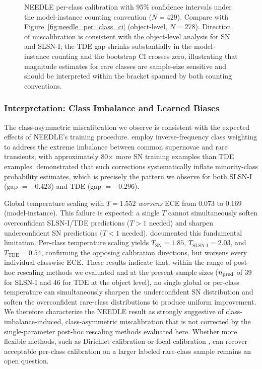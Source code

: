 \documentclass[twocolumn]{aastex631}
\begin{document}
\begin{figure}[t]
\caption{NEEDLE per-class calibration with 95\% confidence intervals
under the model-instance counting convention ($N = 429$). Compare with
Figure~\ref{fig:needle_per_class_ci} (object-level, $N = 278$).
Direction of miscalibration is consistent with the object-level
analysis for SN and SLSN-I; the TDE gap shrinks substantially in the
model-instance counting and the bootstrap CI crosses zero, illustrating
that magnitude estimates for rare classes are sample-size sensitive
and should be interpreted within the bracket spanned by both
counting conventions. \label{fig:needle_per_class_ci_mi}}
\end{figure}

\subsubsection{Interpretation: Class Imbalance and Learned Biases}\label{sec:needle_interp}

The class-asymmetric miscalibration we observe is consistent with
the expected effects of NEEDLE's training procedure.
\citet{sheng2024} employ inverse-frequency class weighting to address the extreme imbalance between common supernovae and rare transients, with approximately 80$\times$ more SN training examples than TDE examples. \citet{vandengoorbergh2022} demonstrated that such corrections systematically inflate minority-class probability estimates, which is precisely the pattern we observe for both SLSN-I (gap $= -0.423$) and TDE (gap $= -0.296$).

Global temperature scaling with $T = 1.552$ \emph{worsens} ECE from 0.073 to 0.169 (model-instance). This failure is expected: a single $T$ cannot simultaneously soften overconfident SLSN-I/TDE predictions ($T > 1$ needed) and sharpen underconfident SN predictions ($T < 1$ needed). \citet{kull2019} documented this fundamental limitation. Per-class temperature scaling yields $T_{\text{SN}} = 1.85$, $T_{\text{SLSN-I}} = 2.03$, and $T_{\text{TDE}} = 0.54$, confirming the opposing calibration directions, but worsens every individual classwise ECE. These results indicate that, within the range of post-hoc rescaling methods we evaluated and at the present sample sizes ($n_{\rm pred}$ of 39 for SLSN-I and 46 for TDE at the object level), no single global or per-class temperature can simultaneously sharpen the underconfident SN distribution and soften the overconfident rare-class distributions to produce uniform improvement. We therefore characterize the NEEDLE result as strongly suggestive of
class-imbalance-induced, class-asymmetric miscalibration that is not
corrected by the single-parameter post-hoc rescaling methods evaluated
here. Whether more flexible methods, such as Dirichlet calibration
\citep{kull2019} or focal calibration \citep{mukhoti2020}, can recover
acceptable per-class calibration on a larger labeled rare-class sample
remains an open question.
\end{document}
